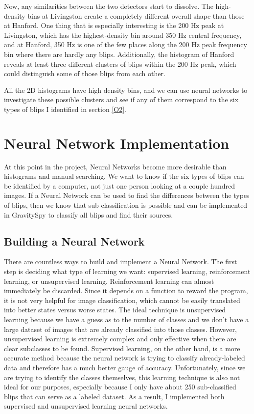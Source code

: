 \documentclass[a4paper]{article}
\begin{document}
Now, any similarities between the two detectors start to dissolve. The high-density bins at Livingston create a completely different overall shape than those at Hanford. One thing that is especially interesting is the 200 Hz peak at Livingston, which has the highest-density bin around 350 Hz central frequency, and at Hanford, 350 Hz is one of the few places along the 200 Hz peak frequency bin where there are hardly any blips. Additionally, the histogram of Hanford reveals at least three different clusters of blips within the 200 Hz peak, which could distinguish some of those blips from each other. 

All the 2D histograms have high density bins, and we can use neural networks to investigate these possible clusters and see if any of them correspond to the six types of blips I identified in section \ref{O2}. 

\section{Neural Network Implementation}

At this point in the project, Neural Networks become more desirable than histograms and manual searching. We want to know if the six types of blips can be identified by a computer, not just one person looking at a couple hundred images. If a Neural Network can be used to find the differences between the types of blips, then we know that sub-classification is possible and can be implemented in GravitySpy to classify all blips and find their sources.

\subsection{Building a Neural Network}

There are countless ways to build and implement a Neural Network. The first step is deciding what type of learning we want: supervised learning, reinforcement learning, or unsupervised learning. Reinforcement learning can almost immediately be discarded. Since it depends on a function to reward the program, it is not very helpful for image classification, which cannot be easily translated into better states versus worse states. The ideal technique is unsupervised learning because we have a guess as to the number of classes and we don't have a large dataset of images that are already classified into those classes. However, unsupervised learning is extremely complex and only effective when there are clear subclasses to be found. Supervised learning, on the other hand, is a more accurate method because the neural network is trying to classify already-labeled data and therefore has a much better gauge of accuracy. Unfortunately, since we are trying to identify the classes themselves, this learning technique is also not ideal for our purposes, especially because I only have about 250 sub-classified blips that can serve as a labeled dataset. As a result, I implemented both supervised and unsupervised learning neural networks.
\end{document}
